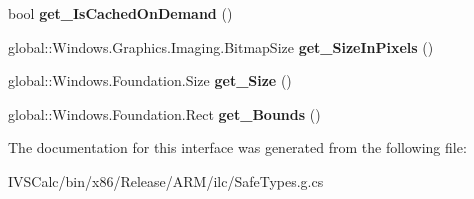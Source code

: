 \begin{DoxyCompactItemize}
\mbox{\label{interface_microsoft_1_1_graphics_1_1_canvas_1_1_i_canvas_virtual_bitmap_a3c292875e188514447d5d2818256c6bf}} 
bool {\bfseries get\+\_\+\+Is\+Cached\+On\+Demand} ()
\item 
\mbox{\label{interface_microsoft_1_1_graphics_1_1_canvas_1_1_i_canvas_virtual_bitmap_abca5720c095b172719483b1feb9e0781}} 
global\+::\+Windows.\+Graphics.\+Imaging.\+Bitmap\+Size {\bfseries get\+\_\+\+Size\+In\+Pixels} ()
\item 
\mbox{\label{interface_microsoft_1_1_graphics_1_1_canvas_1_1_i_canvas_virtual_bitmap_ad9058e36aebef03df13dba2e87901194}} 
global\+::\+Windows.\+Foundation.\+Size {\bfseries get\+\_\+\+Size} ()
\item 
\mbox{\label{interface_microsoft_1_1_graphics_1_1_canvas_1_1_i_canvas_virtual_bitmap_adbf38af3e5bcc018d1cd3d1bc4bd7194}} 
global\+::\+Windows.\+Foundation.\+Rect {\bfseries get\+\_\+\+Bounds} ()
\end{DoxyCompactItemize}


The documentation for this interface was generated from the following file\+:\begin{DoxyCompactItemize}
\item 
I\+V\+S\+Calc/bin/x86/\+Release/\+A\+R\+M/ilc/Safe\+Types.\+g.\+cs\end{DoxyCompactItemize}
